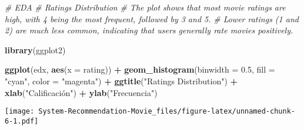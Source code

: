 \documentclass[
]{article}
\newenvironment{Shaded}{\begin{snugshade}}{\end{snugshade}}
\newcommand{\AttributeTok}[1]{\textcolor[rgb]{0.13,0.29,0.53}{#1}}
\newcommand{\CommentTok}[1]{\textcolor[rgb]{0.56,0.35,0.01}{\textit{#1}}}
\newcommand{\FloatTok}[1]{\textcolor[rgb]{0.00,0.00,0.81}{#1}}
\newcommand{\FunctionTok}[1]{\textcolor[rgb]{0.13,0.29,0.53}{\textbf{#1}}}
\newcommand{\NormalTok}[1]{#1}
\newcommand{\SpecialCharTok}[1]{\textcolor[rgb]{0.81,0.36,0.00}{\textbf{#1}}}
\newcommand{\StringTok}[1]{\textcolor[rgb]{0.31,0.60,0.02}{#1}}
\begin{document}
\begin{Shaded}
\begin{Highlighting}[]
\CommentTok{\# EDA}
\CommentTok{\# Ratings Distribution}
\CommentTok{\# The plot shows that most movie ratings are high, with 4 being the most frequent, followed by 3 and 5. }
\CommentTok{\# Lower ratings (1 and 2) are much less common, indicating that users generally rate movies positively.}

\FunctionTok{library}\NormalTok{(ggplot2)}

\FunctionTok{ggplot}\NormalTok{(edx, }\FunctionTok{aes}\NormalTok{(}\AttributeTok{x =}\NormalTok{ rating)) }\SpecialCharTok{+}
  \FunctionTok{geom\_histogram}\NormalTok{(}\AttributeTok{binwidth =} \FloatTok{0.5}\NormalTok{, }\AttributeTok{fill =} \StringTok{"cyan"}\NormalTok{, }\AttributeTok{color =} \StringTok{"magenta"}\NormalTok{) }\SpecialCharTok{+}
  \FunctionTok{ggtitle}\NormalTok{(}\StringTok{"Ratings Distribution"}\NormalTok{) }\SpecialCharTok{+}
  \FunctionTok{xlab}\NormalTok{(}\StringTok{"Calificación"}\NormalTok{) }\SpecialCharTok{+}
  \FunctionTok{ylab}\NormalTok{(}\StringTok{"Frecuencia"}\NormalTok{)}
\end{Highlighting}
\end{Shaded}

\texttt{[image: System-Recommendation-Movie\_files/figure-latex/unnamed-chunk-6-1.pdf]}
\end{document}
